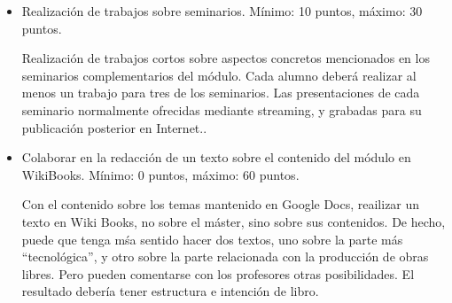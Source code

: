 \documentclass[a4paper,12pt]{article}
\begin{document}
\begin{itemize}
\item Realización de trabajos sobre seminarios. Mínimo: 10 puntos, máximo: 30 puntos.

Realización de trabajos cortos sobre aspectos concretos mencionados en los seminarios complementarios del módulo. Cada alumno deberá realizar al menos un trabajo para tres de los seminarios. Las presentaciones de cada seminario normalmente ofrecidas mediante streaming, y grabadas para su publicación posterior en Internet..

\item Colaborar en la redacción de un texto sobre el contenido del módulo en WikiBooks. Mínimo: 0 puntos, máximo: 60 puntos.

Con el contenido sobre los temas mantenido en Google Docs, reailizar un texto en Wiki Books, no sobre el máster, sino sobre sus contenidos. De hecho, puede que tenga mśa sentido hacer dos textos, uno sobre la parte más ``tecnológica'', y otro sobre la parte relacionada con la producción de obras libres. Pero pueden comentarse con los profesores otras posibilidades. El resultado debería tener estructura e intención de libro.

\end{itemize}






\end{document}

